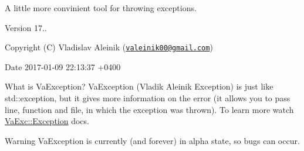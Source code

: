 A little more convinient tool for throwing exceptions. \begin{DoxyParagraph}{Version}
17.. 
\end{DoxyParagraph}
\begin{DoxyParagraph}{Copyright}
(C) Vladislav Aleinik (\href{mailto:valeinik00@gmail.com}{\tt valeinik00@gmail.\+com}) 
\end{DoxyParagraph}
\begin{DoxyParagraph}{Date}
2017-\/01-\/09 22\+:13\+:37 +0400
\end{DoxyParagraph}


\begin{DoxyParagraph}{What is Va\+Exception?}
Va\+Exception (Vladik Aleinik Exception) is just like std\+::exception, but it gives more information on the error (it allows you to pass line, function and file, in which the exception was thrown). To learn more watch \hyperlink{class_va_exc_1_1_exception}{Va\+Exc\+::\+Exception} docs.
\end{DoxyParagraph}
\begin{DoxyWarning}{Warning}
Va\+Exception is currently (and forever) in alpha state, so bugs can occur. 
\end{DoxyWarning}
